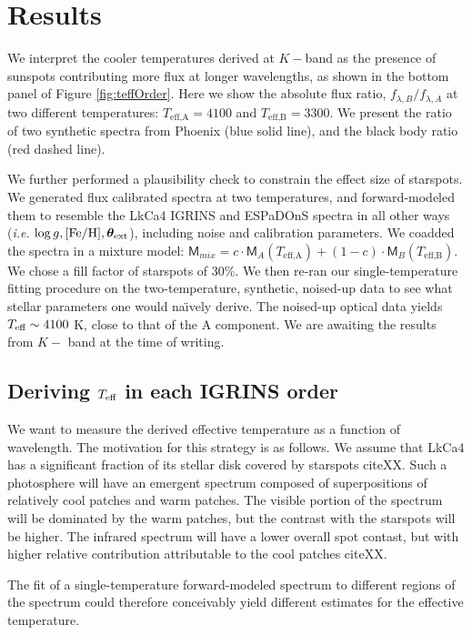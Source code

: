 \documentclass[onecolumn]{emulateapj}%
\begin{document}
\section{Results}
We interpret the cooler temperatures derived at $K-$band as the presence of sunspots contributing more flux at longer wavelengths, as shown in the bottom panel of Figure \ref{fig:teffOrder}.  Here we show the absolute flux ratio, $f_{\lambda, B} / f_{\lambda, A}$ at two different temperatures: $T_\textrm{eff,A} = 4100$ and $T_\textrm{eff,B} = 3300$.  We present the ratio of two synthetic spectra from Phoenix (blue solid line), and the black body ratio (red dashed line).  

We further performed a plausibility check to constrain the effect size of starspots.  We generated flux calibrated spectra at two temperatures, and forward-modeled them to resemble the LkCa4 IGRINS and ESPaDOnS spectra in all other ways (\emph{i.e.} $\log g, [{\rm Fe}/{\rm H}], {\bm \theta}_{\rm ext}$), including noise and calibration parameters.  We coadded the spectra in a mixture model:  $ \mathsf{M}_{mix} = c \cdot \mathsf{M}_A(T_\textrm{eff,A}) + (1-c) \cdot \mathsf{M}_B(T_\textrm{eff,B})$.  We chose a fill factor of starspots of 30\%.  We then re-ran our single-temperature fitting procedure on the two-temperature, synthetic, noised-up data to see what stellar parameters one would na\"{\i}vely derive.  The noised-up optical data yields $T_\textrm{eff} \sim 4100$ K, close to that of the A component.  We are awaiting the results from $K-$ band at the time of writing.


\subsection{Deriving $T_\textrm{eff}$ in each IGRINS order}

We want to measure the derived effective temperature as a function of wavelength.  The motivation for this strategy is as follows.  We assume that LkCa4 has a significant fraction of its stellar disk covered by starspots citeXX.  Such a photosphere will have an emergent spectrum composed of superpositions of relatively cool patches and warm patches.  The visible portion of the spectrum will be dominated by the warm patches, but the contrast with the starspots will be higher.  The infrared spectrum will have a lower overall spot contast, but with higher relative contribution attributable to the cool patches citeXX.  

The fit of a single-temperature forward-modeled spectrum to different regions of the spectrum could therefore conceivably yield different estimates for the effective temperature.
\end{document}
